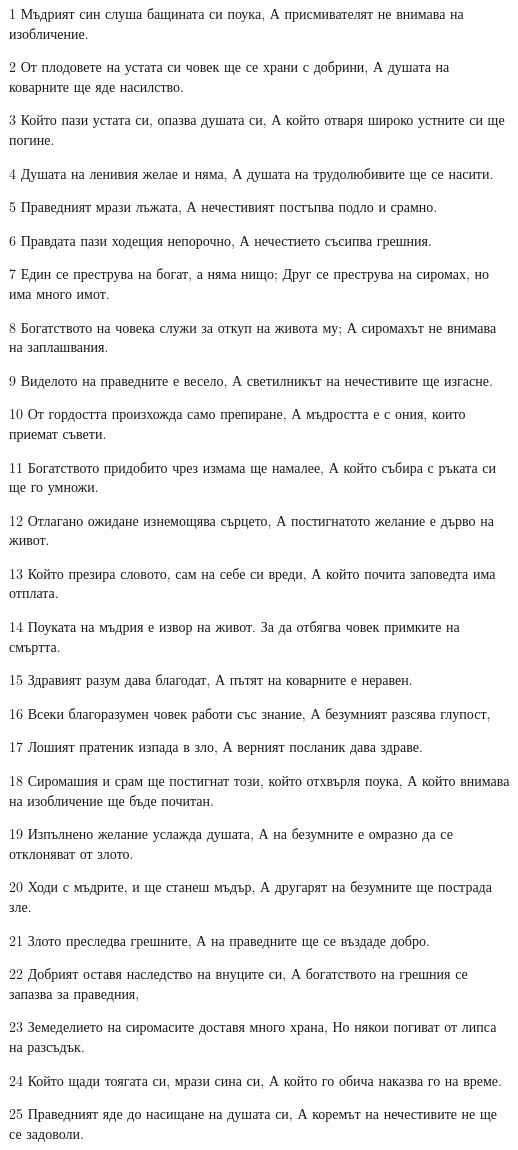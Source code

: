 \par 1 Мъдрият син слуша бащината си поука, А присмивателят не внимава на изобличение.
\par 2 От плодовете на устата си човек ще се храни с добрини, А душата на коварните ще яде насилство.
\par 3 Който пази устата си, опазва душата си, А който отваря широко устните си ще погине.
\par 4 Душата на ленивия желае и няма, А душата на трудолюбивите ще се насити.
\par 5 Праведният мрази лъжата, А нечестивият постъпва подло и срамно.
\par 6 Правдата пази ходещия непорочно, А нечестието съсипва грешния.
\par 7 Един се преструва на богат, а няма нищо; Друг се преструва на сиромах, но има много имот.
\par 8 Богатството на човека служи за откуп на живота му; А сиромахът не внимава на заплашвания.
\par 9 Виделото на праведните е весело, А светилникът на нечестивите ще изгасне.
\par 10 От гордостта произхожда само препиране, А мъдростта е с ония, които приемат съвети.
\par 11 Богатството придобито чрез измама ще намалее, А който събира с ръката си ще го умножи.
\par 12 Отлагано ожидане изнемощява сърцето, А постигнатото желание е дърво на живот.
\par 13 Който презира словото, сам на себе си вреди, А който почита заповедта има отплата.
\par 14 Поуката на мъдрия е извор на живот. За да отбягва човек примките на смъртта.
\par 15 Здравият разум дава благодат, А пътят на коварните е неравен.
\par 16 Всеки благоразумен човек работи със знание, А безумният разсява глупост,
\par 17 Лошият пратеник изпада в зло, А верният посланик дава здраве.
\par 18 Сиромашия и срам ще постигнат този, който отхвърля поука, А който внимава на изобличение ще бъде почитан.
\par 19 Изпълнено желание услажда душата, А на безумните е омразно да се отклоняват от злото.
\par 20 Ходи с мъдрите, и ще станеш мъдър, А другарят на безумните ще пострада зле.
\par 21 Злото преследва грешните, А на праведните ще се въздаде добро.
\par 22 Добрият оставя наследство на внуците си, А богатството на грешния се запазва за праведния,
\par 23 Земеделието на сиромасите доставя много храна, Но някои погиват от липса на разсъдък.
\par 24 Който щади тоягата си, мрази сина си, А който го обича наказва го на време.
\par 25 Праведният яде до насищане на душата си, А коремът на нечестивите не ще се задоволи.

